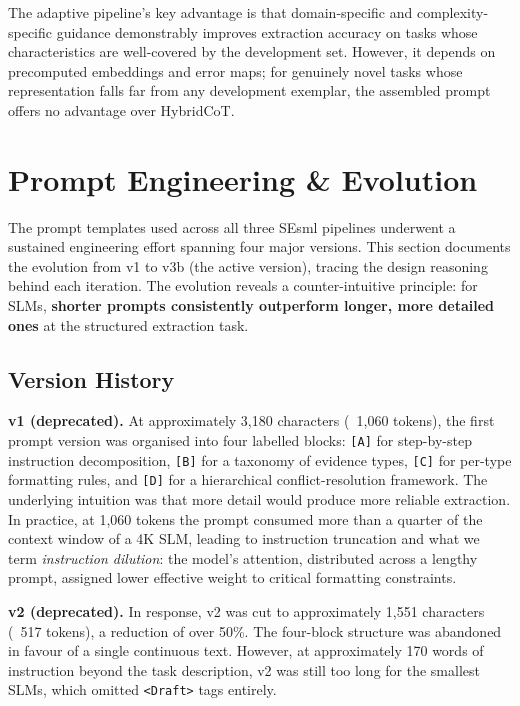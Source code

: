 \documentclass[onecolumn]{ceurart}
\begin{document}
The adaptive pipeline's key advantage is that domain-specific and
complexity-specific guidance demonstrably improves extraction accuracy on tasks
whose characteristics are well-covered by the development set. However, it
depends on precomputed embeddings and error maps; for genuinely novel tasks
whose representation falls far from any development exemplar, the assembled
prompt offers no advantage over HybridCoT.


\section{Prompt Engineering \& Evolution}
\label{sec:prompts}

The prompt templates used across all three SEsml pipelines underwent a sustained
engineering effort spanning four major versions. This section documents the
evolution from v1 to v3b (the active version), tracing the design reasoning
behind each iteration. The evolution reveals a counter-intuitive principle: for
SLMs, \textbf{shorter prompts consistently outperform longer, more detailed
ones} at the structured extraction task.

\subsection{Version History}

\textbf{v1 (deprecated).} At approximately 3,180 characters (~1,060 tokens),
the first prompt version was organised into four labelled blocks: \texttt{[A]}
for step-by-step instruction decomposition, \texttt{[B]} for a taxonomy of
evidence types, \texttt{[C]} for per-type formatting rules, and \texttt{[D]}
for a hierarchical conflict-resolution framework. The underlying intuition was
that more detail would produce more reliable extraction. In practice, at 1,060
tokens the prompt consumed more than a quarter of the context window of a 4K
SLM, leading to instruction truncation and what we term \emph{instruction
dilution}: the model's attention, distributed across a lengthy prompt, assigned
lower effective weight to critical formatting constraints.

\textbf{v2 (deprecated).} In response, v2 was cut to approximately 1,551
characters (~517 tokens), a reduction of over 50\%. The four-block structure
was abandoned in favour of a single continuous text. However, at approximately
170 words of instruction beyond the task description, v2 was still too long for
the smallest SLMs, which omitted \texttt{<Draft>} tags entirely.
\end{document}
